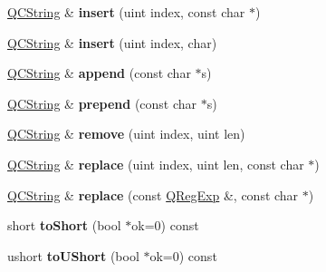 \begin{DoxyCompactItemize}
\item 
\hypertarget{class_q_c_string_a649a47de60a4e5d94aeac8e4e84054ec}{\hyperlink{class_q_c_string}{Q\-C\-String} \& {\bfseries insert} (uint index, const char $\ast$)}\label{class_q_c_string_a649a47de60a4e5d94aeac8e4e84054ec}

\item 
\hypertarget{class_q_c_string_abc582244812bb1c9b2676b650adb1fce}{\hyperlink{class_q_c_string}{Q\-C\-String} \& {\bfseries insert} (uint index, char)}\label{class_q_c_string_abc582244812bb1c9b2676b650adb1fce}

\item 
\hypertarget{class_q_c_string_ac9cd778bd32b34b138a07ceec2674128}{\hyperlink{class_q_c_string}{Q\-C\-String} \& {\bfseries append} (const char $\ast$s)}\label{class_q_c_string_ac9cd778bd32b34b138a07ceec2674128}

\item 
\hypertarget{class_q_c_string_aae81ab82cc1ebf2177ceb4a3ed94a0ec}{\hyperlink{class_q_c_string}{Q\-C\-String} \& {\bfseries prepend} (const char $\ast$s)}\label{class_q_c_string_aae81ab82cc1ebf2177ceb4a3ed94a0ec}

\item 
\hypertarget{class_q_c_string_a7cae163c805f80c63bfc183e105ace3c}{\hyperlink{class_q_c_string}{Q\-C\-String} \& {\bfseries remove} (uint index, uint len)}\label{class_q_c_string_a7cae163c805f80c63bfc183e105ace3c}

\item 
\hypertarget{class_q_c_string_a431902083d92eb63e08ddf47f2716a10}{\hyperlink{class_q_c_string}{Q\-C\-String} \& {\bfseries replace} (uint index, uint len, const char $\ast$)}\label{class_q_c_string_a431902083d92eb63e08ddf47f2716a10}

\item 
\hypertarget{class_q_c_string_ae66d54b4081984abc734643d5296db9e}{\hyperlink{class_q_c_string}{Q\-C\-String} \& {\bfseries replace} (const \hyperlink{class_q_reg_exp}{Q\-Reg\-Exp} \&, const char $\ast$)}\label{class_q_c_string_ae66d54b4081984abc734643d5296db9e}

\item 
\hypertarget{class_q_c_string_a5b0ed833bd201253bec307df94b5bdad}{short {\bfseries to\-Short} (bool $\ast$ok=0) const }\label{class_q_c_string_a5b0ed833bd201253bec307df94b5bdad}

\item 
\hypertarget{class_q_c_string_a04cc2d7dcf50661d371e4dadcde6dd2c}{ushort {\bfseries to\-U\-Short} (bool $\ast$ok=0) const }\label{class_q_c_string_a04cc2d7dcf50661d371e4dadcde6dd2c}


\end{DoxyCompactItemize}
